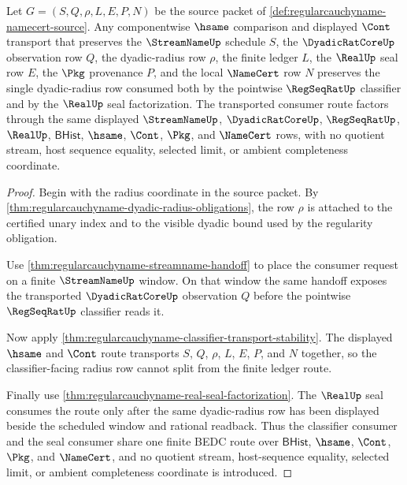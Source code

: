 \begin{theorem}
\label{thm:regularcauchyname-dyadic-radius-transport-composition}
Let $G=(S,Q,\rho,L,E,P,N)$ be the source packet of \autoref{def:regularcauchyname-namecert-source}. Any componentwise $\hsame$ comparison and displayed $\Cont$ transport that preserves the $\StreamNameUp$ schedule $S$, the $\DyadicRatCoreUp$ observation row $Q$, the dyadic-radius row $\rho$, the finite ledger $L$, the $\RealUp$ seal row $E$, the $\Pkg$ provenance $P$, and the local $\NameCert$ row $N$ preserves the single dyadic-radius row consumed both by the pointwise $\RegSeqRatUp$ classifier and by the $\RealUp$ seal factorization. The transported consumer route factors through the same displayed $\StreamNameUp$, $\DyadicRatCoreUp$, $\RegSeqRatUp$, $\RealUp$, $\mathsf{BHist}$, $\hsame$, $\Cont$, $\Pkg$, and $\NameCert$ rows, with no quotient stream, host sequence equality, selected limit, or ambient completeness coordinate.
\end{theorem}
\begin{proof}
Begin with the radius coordinate in the source packet. By \autoref{thm:regularcauchyname-dyadic-radius-obligations}, the row $\rho$ is attached to the certified unary index and to the visible dyadic bound used by the regularity obligation.

Use \autoref{thm:regularcauchyname-streamname-handoff} to place the consumer request on a finite $\StreamNameUp$ window. On that window the same handoff exposes the transported $\DyadicRatCoreUp$ observation $Q$ before the pointwise $\RegSeqRatUp$ classifier reads it.

Now apply \autoref{thm:regularcauchyname-classifier-transport-stability}. The displayed $\hsame$ and $\Cont$ route transports $S$, $Q$, $\rho$, $L$, $E$, $P$, and $N$ together, so the classifier-facing radius row cannot split from the finite ledger route.

Finally use \autoref{thm:regularcauchyname-real-seal-factorization}. The $\RealUp$ seal consumes the route only after the same dyadic-radius row has been displayed beside the scheduled window and rational readback. Thus the classifier consumer and the seal consumer share one finite BEDC route over $\mathsf{BHist}$, $\hsame$, $\Cont$, $\Pkg$, and $\NameCert$, and no quotient stream, host-sequence equality, selected limit, or ambient completeness coordinate is introduced.
\end{proof}

